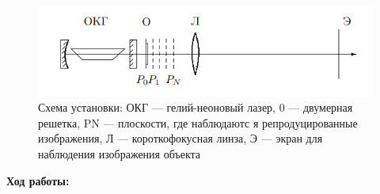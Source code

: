 \documentclass[a4paper, 12pt]{article}%
\begin{document}
	\begin{figure}[H]
	\centering
	\includegraphics[scale=1.5]{ust.png}
	\caption{Схема установки: ОКГ
		— гелий-неоновый лазер, 0 — двумерная решетка,
		PN
		— плоскости, где наблюдаютс
		я репродуцированные
		изображения,
		Л
		—
		короткофокусная линза,
		Э
		— экран для наблюдения изображения объекта}
	\end{figure}
	
	
	\newpage
	
	\textbf{Ход работы: }\\
	
\end{document}
